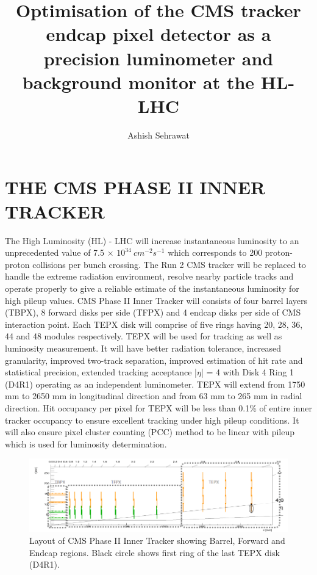 \documentclass[a4paper,11pt]{article}
\title{Optimisation of the CMS tracker endcap pixel detector as a precision luminometer and background monitor at the HL-LHC}
\author*[a,1]{Ashish Sehrawat}
\affiliation[a]{Universidad de Sonora,\\
  Blvd. Luis Encinas J, Calle Av. Rosales \& Centro, Hermosillo, Mexico}
\begin{document}
\maketitle

\section{THE CMS PHASE II INNER TRACKER}
The High Luminosity (HL) - LHC will increase instantaneous luminosity to an unprecedented value of 7.5 $\times$ $10^{34} \:cm^{-2} s^{-1}$ which corresponds to 200 proton-proton collisions per bunch crossing. The Run 2 CMS tracker will be replaced to handle the extreme radiation environment, resolve nearby particle tracks and operate properly to give a reliable estimate of the instantaneous luminosity for high pileup values. CMS Phase II Inner Tracker will consists of four barrel layers (TBPX), 8 forward disks per side (TFPX) and 4 endcap disks per side of CMS interaction point. Each TEPX disk will comprise of five rings having 20, 28, 36, 44 and 48 modules respectively. TEPX will be used for tracking as well as luminosity measurement. It will have better radiation tolerance, increased granularity, improved two-track separation,
improved estimation of hit rate and statistical precision, extended tracking acceptance |$\eta$| = 4 with Disk 4 Ring 1 (D4R1) operating as an independent luminometer. TEPX will extend from 1750 mm to 2650 mm in longitudinal direction and from 63 mm to 265 mm in radial direction. Hit occupancy per pixel for TEPX will be less than 0.1\% of entire inner tracker occupancy to ensure excellent tracking under high pileup conditions. It will also ensure pixel cluster counting (PCC) method to be linear with pileup which is used for luminosity determination.

\begin{figure}[htb]
  \centering
  \includegraphics[width=0.8\columnwidth]{tracker_geometry.png}
  \caption{Layout of CMS Phase II Inner Tracker showing Barrel, Forward and Endcap regions. Black circle shows first ring of the last TEPX disk (D4R1).}
  \label{fig:CMS}
\end{figure}
\end{document}
